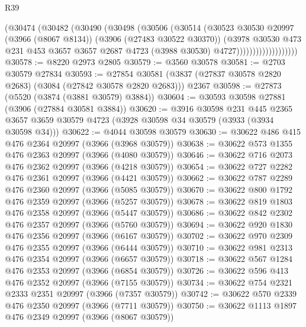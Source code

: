 \begin{lexlean}{R39}
\begin{coremodule}
                          (@30474
                            (@30482
                              (@30490
                                (@30498
                                  (@30506
                                    (@30514
                                      (@30523
                                        @30530
                                        @20997
                                        (@3966 (@8067 @8134))
                                        (@3906 (@27483 @30522 @30370))
                                        (@3978
                                          @30530
                                          @473
                                          @231
                                          @453
                                          @3657
                                          @3657
                                          @2687
                                          @4723
                                          (@3988 @30530)
                                          @4727)))))))))))))))))))
@30578 := @8220 @2973 @2805
@30579 := @3560 @30578
@30581 := @2703 @30579 @27834
@30593 := @27854
    @30581
    (@3837 (@27837 @30578 @2820 @2683) (@3084 (@27842 @30578 @2820 @2683)))
    @2367
@30598 := @27873 (@5520 (@3874 (@3881 @30579) @3884))
@30604 := @30593 @30598 @27881 (@3906 (@27884 @30581 @3884))
@30620 := @3916
    @30598
    @231
    @445
    @2365
    @3657
    @3659
    @30579
    @4723
    (@3928 @30598 @34 @30579 (@3933 (@3934 @30598 @34)))
@30622 := @4044 @30598 @30579
@30630 := @30622 @486 @415 @476 @2364 @20997 (@3966 (@3968 @30579))
@30638 := @30622 @573 @1355 @476 @2363 @20997 (@3966 (@4080 @30579))
@30646 := @30622 @716 @2073 @476 @2362 @20997 (@3966 (@4218 @30579))
@30654 := @30622 @727 @2282 @476 @2361 @20997 (@3966 (@4421 @30579))
@30662 := @30622 @787 @2289 @476 @2360 @20997 (@3966 (@5085 @30579))
@30670 := @30622 @800 @1792 @476 @2359 @20997 (@3966 (@5257 @30579))
@30678 := @30622 @819 @1803 @476 @2358 @20997 (@3966 (@5447 @30579))
@30686 := @30622 @842 @2302 @476 @2357 @20997 (@3966 (@5760 @30579))
@30694 := @30622 @920 @1830 @476 @2356 @20997 (@3966 (@6167 @30579))
@30702 := @30622 @970 @2309 @476 @2355 @20997 (@3966 (@6444 @30579))
@30710 := @30622 @981 @2313 @476 @2354 @20997 (@3966 (@6657 @30579))
@30718 := @30622 @567 @1284 @476 @2353 @20997 (@3966 (@6854 @30579))
@30726 := @30622 @596 @413 @476 @2352 @20997 (@3966 (@7155 @30579))
@30734 := @30622 @754 @2321 @2333 @2351 @20997 (@3966 (@7357 @30579))
@30742 := @30622 @570 @2339 @476 @2350 @20997 (@3966 (@7711 @30579))
@30750 := @30622 @1113 @1897 @476 @2349 @20997 (@3966 (@8067 @30579))

\end{coremodule}
\end{lexlean}
